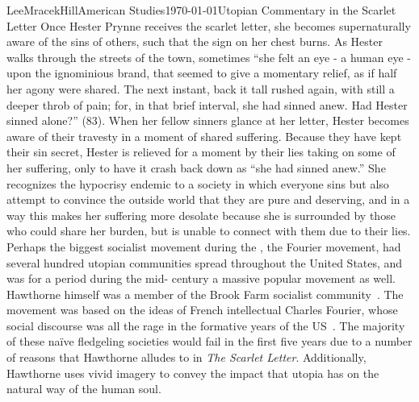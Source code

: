 \documentclass[12pt, letterpaper]{article}
\begin{document}
\begin{mla}{Lee}{Mracek}{Hill}{American Studies}{\today}{Utopian Commentary in the Scarlet Letter}
Once Hester Prynne receives the scarlet letter, she becomes supernaturally aware of the sins of others, such that the sign on her chest burns. As Hester walks through the streets of the town, sometimes ``she felt an eye - a human eye - upon the ignominious brand, that seemed to give a momentary relief, as if half her agony were shared. The next instant, back it tall rushed again, with still a deeper throb of pain; for, in that brief interval, she had sinned anew. Had Hester sinned alone?'' (83). When her fellow sinners glance at her letter, Hester becomes aware of their travesty in a moment of shared suffering. Because they have kept their sin secret, Hester is relieved for a moment by their lies taking on some of her suffering, only to have it crash back down as ``she had sinned anew.'' She recognizes the hypocrisy endemic to a society in which everyone sins but also attempt to convince the outside world that they are pure and deserving, and in a way this makes her suffering more desolate because she is surrounded by those who could share her burden, but is unable to connect with them due to their lies. Perhaps the biggest socialist movement during the , the Fourier movement, had several hundred utopian communities spread throughout the United States, and was for a period during the mid- century a massive popular movement as well. Hawthorne himself was a member of the Brook Farm socialist community~\parencite{preucel}. The movement was based on the ideas of French intellectual Charles Fourier, whose social discourse was all the rage in the formative years of the US~\parencite{nako}. The majority of these na{\"i}ve fledgeling societies would fail in the first five years due to a number of reasons that Hawthorne alludes to in \textit{The Scarlet Letter}.
Additionally, Hawthorne uses vivid imagery to convey the impact that utopia has on the natural way of the human soul.\\
\end{mla}
\end{document}
